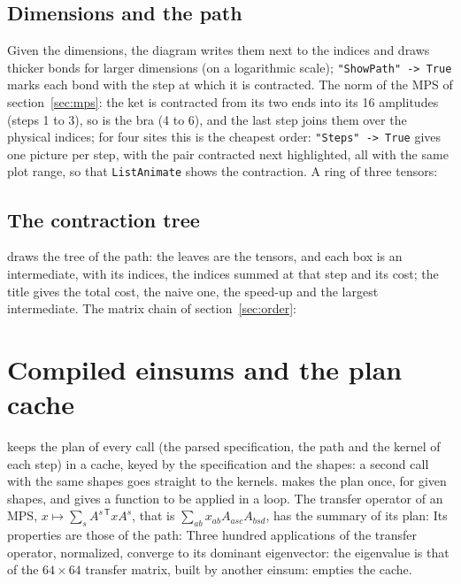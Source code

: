 \documentclass[11pt,a4paper]{article}
\begin{document}
\subsection{Dimensions and the path}
Given the dimensions, the diagram writes them next to the indices and draws thicker bonds for larger dimensions (on a
logarithmic scale); \texttt{"ShowPath" -> True} marks each bond with the step at which it is contracted. The norm of the
MPS of section~\ref{sec:mps}: the ket is contracted from its two ends into its 16 amplitudes (steps 1 to 3), so is the bra
(4 to 6), and the last step joins them over the physical indices; for four sites this is the cheapest order:
\texttt{"Steps" -> True} gives one picture per step, with the pair contracted next highlighted, all with the same plot
range, so that \texttt{ListAnimate} shows the contraction. A ring of three tensors:

\subsection{The contraction tree}
 draws the tree of the path: the leaves are the tensors, and each box is an intermediate, with its indices,
the indices summed at that step and its cost; the title gives the total cost, the naive one, the speed-up and the largest
intermediate. The matrix chain of section~\ref{sec:order}:

\section{Compiled einsums and the plan cache}
 keeps the plan of every call (the parsed specification, the path and the kernel of each step) in a cache,
keyed by the specification and the shapes: a second call with the same shapes goes straight to the kernels.
 makes the plan once, for given shapes, and gives a function to be applied in a loop. The transfer
operator of an MPS, $x\mapsto\sum_sA^{s\,\mathsf T}xA^s$, that is $\sum_{ab}x_{ab}A_{asc}A_{bsd}$, has the summary of its
plan:
Its properties are those of the path:
Three hundred applications of the transfer operator, normalized, converge to its dominant eigenvector: the eigenvalue is
that of the $64\times64$ transfer matrix, built by another einsum:
 empties the cache.
\end{document}
